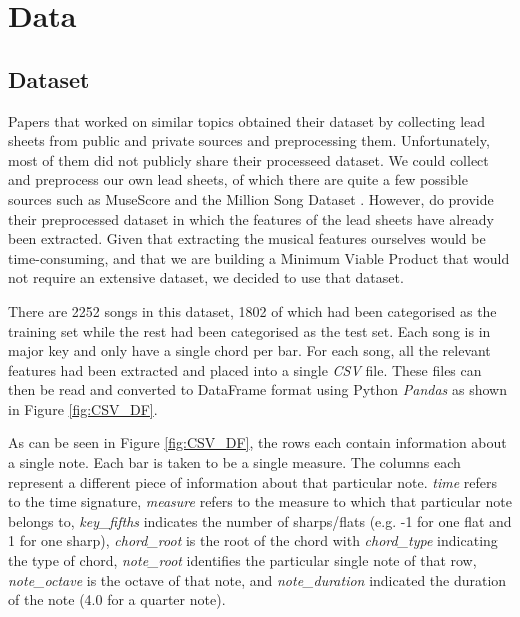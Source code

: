 
\chapter{Data} %

\label{Chapter3} %


\section{Dataset}
Papers that worked on similar topics \cite{MySong} \cite{BLSTM} \cite{MLForChords} obtained their dataset by collecting lead sheets from public and private sources and preprocessing them. Unfortunately, most of them did not publicly share their processeed dataset. We could collect and preprocess our own lead sheets, of which there are quite a few possible sources such as MuseScore and the Million Song Dataset \cite{Bertin-Mahieux2011}. However, \cite{BLSTM} do provide their preprocessed dataset in which the features of the lead sheets have already been extracted. Given that extracting the musical features ourselves would be time-consuming, and that we are building a Minimum Viable Product that would not require an extensive dataset, we decided to use that dataset.

There are 2252 songs in this dataset, 1802 of which had been categorised as the training set while the rest had been categorised as the test set. Each song is in major key and only have a single chord per bar. For each song, all the relevant features had been extracted and placed into a single \emph{CSV} file. These files can then be read and converted to DataFrame format using Python \emph{Pandas} as shown in Figure \ref{fig:CSV_DF}.

As can be seen in Figure \ref{fig:CSV_DF}, the rows each contain information about a single note. Each bar is taken to be a single measure. The columns each represent a different piece of information about that particular note. \emph{time} refers to the time signature, \emph{measure} refers to the measure to which that particular note belongs to, \emph{key\_fifths} indicates the number of sharps/flats (e.g. -1 for one flat and 1 for one sharp), \emph{chord\_root} is the root of the chord with \emph{chord\_type} indicating the type of chord, \emph{note\_root} identifies the particular single note of that row, \emph{note\_octave} is the octave of that note, and \emph{note\_duration} indicated the duration of the note (4.0 for a quarter note).

